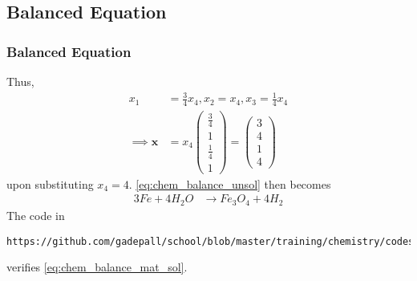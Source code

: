 \documentclass{beamer}
\theoremstyle{remark}
\newcommand{\myvec}[1]{\ensuremath{\begin{pmatrix}#1\end{pmatrix}}}
\let\vec\mathbf
\numberwithin{equation}{section}
\begin{document}
\subsection{Balanced Equation}
\begin{frame}[fragile]
\frametitle{Balanced Equation}

Thus, 
\begin{align}
\label{eq:chem_balance_mat_sol}
x_1 &= \frac{3}{4}x_4, x_2 = x_4, x_3 = \frac{1}{4}x_4
\\
\implies \vec{x} &= x_4\myvec{\frac{3}{4} \\ 1 \\ \frac{1}{4} \\ 1}= \myvec{3 \\ 4 \\ 1 \\ 4}
\end{align}
%
upon substituting $x_4 = 4$.
%
\eqref{eq:chem_balance_unsol} then becomes
%
\begin{align}
\label{eq:chem_balance_final}
3Fe+4H_2 O &\rightarrow Fe_3 O_4 + 4H_2
\end{align}
The code in 
{\footnotesize
\begin{lstlisting}
https://github.com/gadepall/school/blob/master/training/chemistry/codes/chembal.py
\end{lstlisting}
}
verifies \eqref{eq:chem_balance_mat_sol}.
%
\end{frame}
\fi
%
%  
%
%
\end{document}
